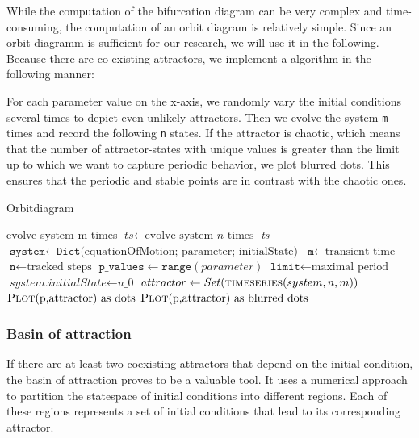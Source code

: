 \documentclass[a4paper,12pt, twoside]{article} %
\begin{document}
While the computation of the bifurcation diagram can be very complex and time-consuming, the computation of an orbit diagram is relatively simple. Since an orbit diagramm 
is sufficient for our research, we will use it in the following. Because there are co-existing attractors, we implement a algorithm in the following manner:


For each parameter value on the x-axis, we randomly vary the initial conditions several times to depict even unlikely attractors. Then we evolve the system \texttt{m} times and record the following \texttt{n} states. If the attractor is chaotic,
which means that the number of attractor-states with unique values is greater than the limit up to which we want to capture periodic behavior, we plot blurred dots. This ensures that 
the periodic and stable points are in contrast with the chaotic ones. 

\begin{algorithm}[H]
  \caption{Orbitdiagram}\label{orbit}
  \begin{algorithmic}[1]
    \State evolve system m times
    \State $\textit{ts} \gets \text{evolve system } \textit{n} \text{ times}$
    \State \Return \textit{ts}
  \EndFunction
    \State $\texttt{system} \gets \texttt{Dict}\text{(equationOfMotion; parameter; initialState)}$
    \State $\texttt{m} \gets \text{transient time}$
    \State $\texttt{n} \gets \text{tracked steps}$
    \State $\texttt{p\_values} \gets \texttt{range}(parameter)$
    \State $\texttt{limit} \gets \text{maximal period}$
      \Repeat
        \State $\textit{system.initialState} \gets \textit{u_0}$
        \State $attractor \gets Set(\Call{timeseries}{system, n, m})$
          \State $\text{\Call{Plot}{p,attractor} as dots}$
        \Else 
          \State $\text{\Call{Plot}{p,attractor} as blurred dots}$
        \EndIf
    \EndFor
  \EndProcedure
  \end{algorithmic}
\end{algorithm}




\subsubsection{Basin of attraction}

If there are at least two coexisting attractors that depend on the initial condition, the basin of attraction proves to be a valuable tool. 
It uses a numerical approach to partition the statespace of initial conditions into different regions. 
Each of these regions represents a set of initial conditions that lead to its corresponding attractor.
\end{document}
